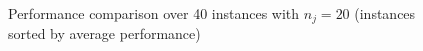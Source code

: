 \documentclass{article}
\begin{document}
\begin{figure}
   \vspace{0.73em}
\caption{Performance comparison over 40 instances with $n_j=20$ (instances
sorted by average performance)}\label{fig:malapertresultcomp}
\end{figure}
\end{document}
